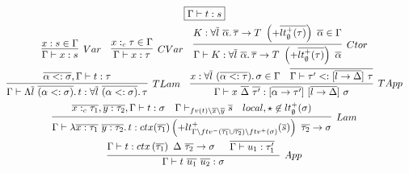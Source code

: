 \documentclass[acmsmall,review,screen]{acmart}
\newcommand{\mathframebox}[1]{\framebox{$\displaystyle #1$}}
\newcommand{\ap}{~}
\newcommand{\ctx}[1]{ctx\left(#1\right)~}
\begin{document}
\begin{figure}
    \begin{gather*}
        \mathframebox{\Gamma\vdash t : s} \\
        \begin{array}{ccc}
            \infer[Var]{\Gamma\vdash x : s}{x : s \in \Gamma} &
            \infer[CVar]{\Gamma\vdash x : \tau}{x :_c \tau \in \Gamma} &
            \infer[Ctor]{\Gamma\vdash K : \forall\overline{l}\ \overline{\alpha}\ldotp \overline{\tau}\to T \ap\left(+\overline{lt_\emptyset^+(\tau)}\right)\ap \overline{\alpha}}{K : \forall\overline{l}\ \overline{\alpha}\ldotp \overline{\tau}\to T \ap\left(+\overline{lt_\emptyset^+(\tau)}\right)\ap \overline{\alpha} \in \Gamma}
        \end{array} \\
        \begin{array}{cc}
            \infer[TLam]{
                \Gamma\vdash\Lambda\overline{l}\ap\overline{(\alpha <: \sigma)}\ldotp t : \forall\overline{l}\ap\overline{(\alpha <: \sigma)}\ldotp\tau
            }{
                \overline{\alpha <: \sigma}, \Gamma\vdash t : \tau
            } &
            \infer[TApp]{
                \Gamma\vdash x\ap\overline{\Delta}\ap\overline{\tau'} : [\overline{\alpha\to\tau'}]\ap[\overline{l\to\Delta}]\ap\sigma
            }{
                x : \forall\overline{l}\ap(\overline{\alpha <: \tau})\ldotp \sigma \in \Gamma
                &
                \overline{\Gamma\vdash\tau' <: [\overline{l\to\Delta}]\ap\tau}
            }
        \end{array} \\
        \infer[Lam]{
            \Gamma\vdash \lambda \overline{x : \tau_1} ~ \overline{y : \tau_2} \ldotp t : ctx(\overline{\tau_1}) \left(+{lt_{\Gamma\setminus ftv^-(\overline{\tau_1}\cup\overline{\tau_2}) \setminus ftv^+(\sigma)}^+(\overline{s})}\right)~ \overline{\tau_2} \to \sigma
        }{
            \overline{x :_c \tau_1}, \overline{y : \tau_2}, \Gamma\vdash t : \sigma
            &
            \Gamma\vdash_{fv(t)\setminus \overline{x}\setminus\overline{y}}\overline{s}
            &
            local, \star \not\in lt_\emptyset^+(\sigma)
        } \\
        \infer[App]{
            \Gamma\vdash t \ap \overline{u_1} \ap \overline{u_2} : \sigma
        } {
            \Gamma\vdash t : \ctx{\overline{\tau_1}} \Delta~\overline{\tau_2}\to\sigma
            &
            \begin{array}{c}
                \overline{\Gamma\vdash u_1 : \tau_1'} \\

\end{array}}
\end{gather*}
\end{figure}
\end{document}
